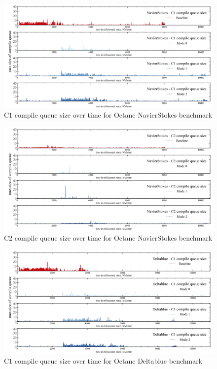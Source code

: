 \begin{figure}[ht]
  \begin{center}
    \centering
    \includegraphics[width=1.0\textwidth]{figures/octane_queue_navierstokes_separate_c1.png}
    \caption{C1 compile queue size over time for Octane NavierStokes benchmark}
    \label{f:octane_queue_navierstokes_separate_c1}
  \end{center}
\end{figure}
\begin{figure}[ht]
  \begin{center}
    \centering
    \includegraphics[width=1.0\textwidth]{figures/octane_queue_navierstokes_separate_c2.png}
    \caption{C2 compile queue size over time for Octane NavierStokes benchmark}
    \label{f:octane_queue_navierstokes_separate_c2}
  \end{center}
\end{figure}
\begin{figure}[ht]
  \begin{center}
    \centering
    \includegraphics[width=1.0\textwidth]{figures/octane_queue_deltablue_separate_c1.png}
    \caption{C1 compile queue size over time for Octane Deltablue benchmark}
    \label{f:octane_queue_deltablue_separate_c1}
  \end{center}
\end{figure}
